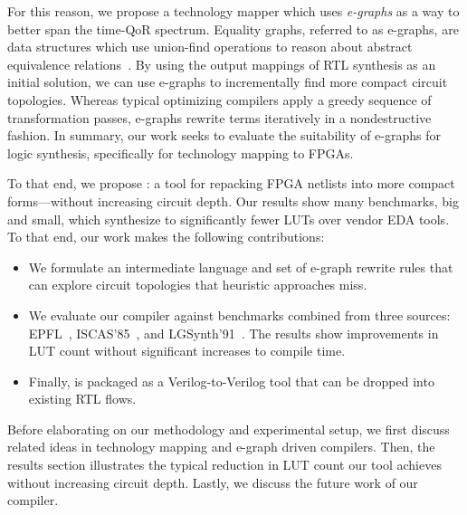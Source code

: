 For this reason, we propose a technology mapper which uses \textit{e-graphs} as
a way to better span the time-QoR spectrum. Equality graphs, referred to as
e-graphs, are data structures which use union-find operations to reason about
abstract equivalence relations~\cite{eggpaper}. By using the output mappings of
RTL synthesis as an initial solution, we can use e-graphs to incrementally find
more compact circuit topologies. Whereas typical optimizing compilers apply a
greedy sequence of transformation passes, e-graphs rewrite terms iteratively in
a nondestructive fashion. In summary, our work seeks to evaluate the
suitability of e-graphs for logic synthesis, specifically for technology
mapping to FPGAs.

To that end, we propose \shortname{}: a tool for repacking FPGA netlists into
more compact forms---without increasing circuit depth. Our results show many
benchmarks, big and small, which synthesize to significantly fewer LUTs over
vendor EDA tools. To that end, our work makes the following contributions:

\begin{itemize}
    \item We formulate an intermediate language and set of e-graph rewrite rules that can
          explore circuit topologies that heuristic approaches miss.
    \item We evaluate our compiler against \nbenchmarks{} benchmarks combined from three
          sources: EPFL~\cite{epflbench}, ISCAS'85~\cite{iscasbench}, and
          LGSynth'91~\cite{lgsynthbench}. The results show improvements in LUT count
          without significant increases to compile time.
    \item Finally, \shortname{} is packaged as a Verilog-to-Verilog tool that can be
          dropped into existing RTL flows.
\end{itemize}

Before elaborating on our methodology and experimental setup, we first discuss
related ideas in technology mapping and e-graph driven compilers. Then, the
results section illustrates the typical reduction in LUT count our tool
achieves without increasing circuit depth. Lastly, we discuss the future work
of our compiler.